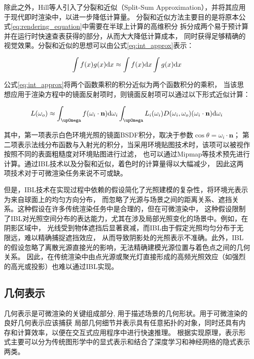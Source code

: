 除此之外，Hill等人\cite{Hill_2014}引入了分裂和近似（Split-Sum Approximation），并将其应用于现代即时渲染中，以进一步降低计算量。
分裂和近似方法主要目的是将原本公式\eqref{eq:rendering_equation}中需要在半球上计算的高维积分
拆分成两个易于预计算并在运行时快速查表获得的部分，从而大大降低计算成本，
同时获得足够精确的视觉效果。分裂和近似的思想可以由公式\eqref{eq:int_approx}表示：

\begin{equation}
  \int f(x)g(x){\rm{d}}x\approx \int{f(x){\rm{d}}x} \int{g(x){\rm{d}}x}
  \label{eq:int_approx}
\end{equation}

公式\eqref{eq:int_approx}将两个函数乘积的积分近似为两个函数积分的乘积，
当该思想应用于渲染方程中的镜面反射项时，则镜面反射项可以通过以下形式近似计算：

\begin{equation}
  L(\omega_o)\approx 
  \int_{\upOmega}{f(\omega_i\cdot{\bf{n}}){\rm{d}}\omega_i}
  \int_{\upOmega}{L_i(\omega_i)D(\omega_i,\omega_o)(\omega_i\cdot{\bf{n}}){\rm{d}}\omega_i}
  \label{eq:L_omega_o_approx}
\end{equation}

其中，第一项表示白色环境光照的镜面BSDF积分，取决于参数$\cos{\theta}=\omega_i\cdot{\mathbf{n}}；$
第二项表示法线分布函数与入射光的积分，当采用环境贴图技术时，该项可以被视作按照不同的表面粗糙度对环境贴图进行过滤，
也可以通过Mipmap等技术预先进行计算。通过IBL技术以及分裂和近似，着色时的计算量得以大幅减少，
因此这两项技术对于可微渲染任务来说不可或缺。

但是，IBL技术在实现过程中依赖的假设简化了光照建模的复杂性，将环境光表示为来自球面上的均匀方向分布，
而忽略了光源与场景之间的距离关系、遮挡关系。这种假设在许多传统渲染任务中是合理的，但在可微渲染中，
这种假设限制了IBL对光照空间分布的表达能力，尤其在涉及局部光照变化的场景中。例如，在阴影区域中，
光线受到物体遮挡后显著衰减，而IBL由于假定光照均匀分布于无限远，难以精确捕捉遮挡效应，
从而导致阴影处的光照表示不准确。此外，IBL的假设忽略了离散光源直接光的影响，无法精确建模光源位置与着色点之间的几何关系。
因此，在传统渲染中由点光源或聚光灯直接形成的高频光照效应（如强烈的高光或投影）也难以通过IBL实现。

\subsection{几何表示}
几何表示是可微渲染的关键组成部分, 用于描述场景的几何形状。用于可微渲染的良好几何表示应该捕获
局部几何细节并表示具有任意拓扑的对象，同时还具有内存和计算效率，以便在交互式应用程序中进行快速推理。
根据实现原理，表示形式主要可以分为传统图形学中的显式表示和结合了深度学习和神经网络的隐式表示两类。


